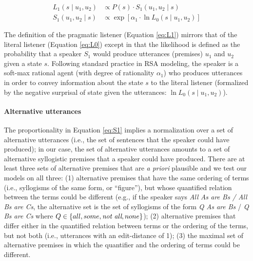 \documentclass[floatsintext, doc]{apa6}
\begin{document}
\begin{align}
L_1(s \mid u_1,  u_2)& \propto  P(s)\cdot S_1(u_1, u_2 \mid s)  \label{eq:L1} \\ 
S_1(u_1, u_2 \mid s) &\propto  \exp [ \alpha_1 \cdot \ln L_0(s \mid u_1,  u_2)]  \label{eq:S1}
\end{align}

The definition of the pragmatic listener (Equation \ref{eq:L1}) mirrors that of the literal listener (Equation \ref{eq:L0}) except in that the likelihood is defined as the probability that a speaker $S_1$ would produce utterances (premises) $u_1$ and $u_2$ given a state $s$.
Following standard practice in RSA modeling, the speaker is a soft-max rational agent (with degree of rationality $\alpha_1$) who produces utterances in order to convey information about the state $s$ to the literal listener (formalized by the negative surprisal of state given the utterances: $\ln L_0(s \mid u_1,  u_2)$).

\paragraph{Alternative utterances}
The proportionality in Equation \ref{eq:S1} implies a normalization over a set of alternative utterances (i.e., the set of sentences that the speaker could have produced); in our case, the set of alternative utterances amounts to a set of alternative syllogistic premises that a speaker could have produced. 
There are at least three sets of alternative premises that are \emph{a priori} plausible and we test our models on all three: (1) alternative premises that have the same ordering of terms (i.e., syllogisms of the same form, or ``figure''), but whose quantified relation between the terms could be different (e.g., if the speaker says \emph{All As are Bs / All Bs are Cs}, the alternative set is the set of syllogisms of the form \emph{Q As are Bs} / \emph{Q Bs are Cs} where $Q \in \{all, some, \emph{not all}, none\}$); (2) alternative premises that differ either in the quantified relation between terms or the ordering of the terms, but not both (i.e., utterances with an edit-distance of 1); (3) the maximal set of alternative premises in which the quantifier and the ordering of terms could be different.
\end{document}
